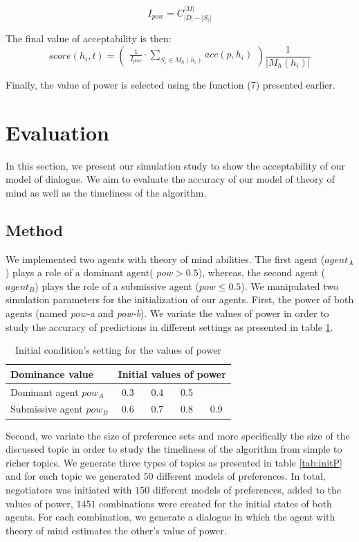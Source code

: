 \documentclass[sigconf]{aamas}  %
\begin{document}
	$$I_{pow} =  C_{|D|-|S_i|}^{|M|}$$
	
	
	The final value of acceptability is then:
	\begin{equation}
	score(h_i, t)= \left( \begin{array}{c}  \frac{1}{I_{pow}} \cdot \sum_{S_i \in M_h(h_i) } acc(p, h_i) 
	\end{array}\right) \frac{1}{| M_h(h_i)|}
	\end{equation}
	
	Finally, the value of power is selected using the function (7) presented earlier.
	
	
	\section{Evaluation}
	In this section, we present our simulation study to show the acceptability of our model of dialogue. We aim to evaluate the accuracy of our model of theory of mind as well as the timeliness of the algorithm.
	
	\subsection{Method}
	
	We implemented two agents with theory of mind abilities.
	The first agent ($agent_A$) plays a role of a dominant agent( $pow > 0.5$), whereas, the second agent ($agent_B$) plays the role of a submissive agent ($pow \leq 0.5$). 
	We manipulated two simulation parameters for the initialization of our agents. First, the power of both agents (named \emph{pow-a} and \emph{pow-b}). We variate the values of power in order to study the accuracy of predictions in different settings as presented in table \ref{tab:powsettings}.
		\begin{table}[t]
			\centering
			\caption{Initial condition's setting for the values of power} 
			\begin{tabular}{|l|cccc|}
				\hline 
				\textbf{Dominance value } &	\multicolumn{4}{c|}{ Initial values of power } \\
				\hline
				Dominant agent $pow_A$ & 0.3 & 0.4 & 0.5 &  \\
				\hline
				Submissive agent $pow_B$ & 0.6 & 0.7 & 0.8 & 0.9\\
				\hline
			\end{tabular}
			
			\label{tab:powsettings}
		\end{table}
		
	Second, we variate the size of preference sets and more specifically the size of the discussed topic in order to study the timeliness of the algorithm from simple to richer topics. We generate three types of topics as presented in table \ref{tab:initP} and for each topic we generated $50$ different models of preferences. In total, negotiators was initiated with $150$ different models of preferences, added to the values of power,  $1451$ combinations were created for the initial states of both agents. For each combination, we generate a dialogue in which the agent with theory of mind estimates the other's value of power.
\end{document}
